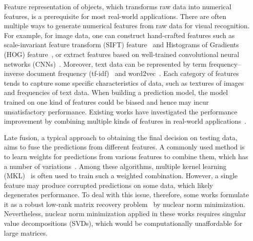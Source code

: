 \documentclass[10pt,twocolumn,letterpaper]{article}
\begin{document}
Feature representation of objects, which transforms raw data into numerical features, is a prerequisite for most real-world applications.
There are often multiple ways to generate numerical features from raw data for visual recognition.
For example, for image data, one can construct hand-crafted features such as scale-invariant feature transform
(SIFT) feature~\cite{loweijcv2004distinctive} and Histograms of Gradients (HOG) feature~\cite{dalalcvpr2005histograms},
or extract features based on well-trained convolutional neural networks (CNNs)~\cite{krizhevsky2012imagenet}.
Moreover, text data can be represented by term frequency–inverse document frequency (tf-idf)~\cite{manning2008introduction} and word2vec~\cite{mikoloviclr2013efficient}.
Each category of features tends to capture some specific characteristics of data,
such as textures of images and frequencies of text data.
When building a prediction model, the model trained on one kind of features could be biased and hence may incur unsatisfactory performance.
Existing works have investigated the performance improvement by combining multiple kinds of features in real-world applications~\cite{gehler2009feature,ye2012robust,xuiccv2013feature,lai2015learning}.


Late fusion, a typical approach to obtaining the final decision on testing data, aims to fuse the predictions from different features.
A commonly used method is to learn weights for predictions from various features to combine them, which has a number of variations~\cite{gehler2009feature,xuiccv2013feature,lai2015learning}.
Among these algorithms, multiple kernel learning (MKL)~\cite{lanckriet2004learning,Rakotomamonjy2008Simplemkl} is often used to train such a weighted combination.
However, a single feature may produce corrupted predictions on some data, which likely degenerates performance.
To deal with this issue, therefore, some works formulate it as a robust low-rank matrix recovery problem~\cite{gaoijcai2016robust,ye2012robust} by nuclear norm minimization.
Nevertheless, nuclear norm minimization applied in these works requires singular value decompositions (SVDs), which would be computationally unaffordable for large matrices.
\end{document}
